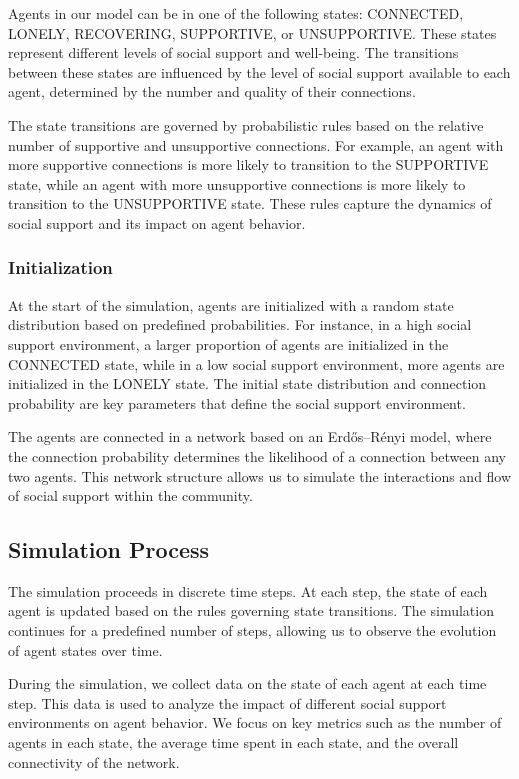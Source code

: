 \documentclass{article} %
\begin{document}
Agents in our model can be in one of the following states: CONNECTED, LONELY, RECOVERING, SUPPORTIVE, or UNSUPPORTIVE. These states represent different levels of social support and well-being. The transitions between these states are influenced by the level of social support available to each agent, determined by the number and quality of their connections.

The state transitions are governed by probabilistic rules based on the relative number of supportive and unsupportive connections. For example, an agent with more supportive connections is more likely to transition to the SUPPORTIVE state, while an agent with more unsupportive connections is more likely to transition to the UNSUPPORTIVE state. These rules capture the dynamics of social support and its impact on agent behavior.

\subsubsection{Initialization}
\label{sec:initialization}

At the start of the simulation, agents are initialized with a random state distribution based on predefined probabilities. For instance, in a high social support environment, a larger proportion of agents are initialized in the CONNECTED state, while in a low social support environment, more agents are initialized in the LONELY state. The initial state distribution and connection probability are key parameters that define the social support environment.

The agents are connected in a network based on an Erdős–Rényi model, where the connection probability determines the likelihood of a connection between any two agents. This network structure allows us to simulate the interactions and flow of social support within the community.

\subsection{Simulation Process}
\label{sec:simulation_process}

The simulation proceeds in discrete time steps. At each step, the state of each agent is updated based on the rules governing state transitions. The simulation continues for a predefined number of steps, allowing us to observe the evolution of agent states over time.

During the simulation, we collect data on the state of each agent at each time step. This data is used to analyze the impact of different social support environments on agent behavior. We focus on key metrics such as the number of agents in each state, the average time spent in each state, and the overall connectivity of the network.
\end{document}
